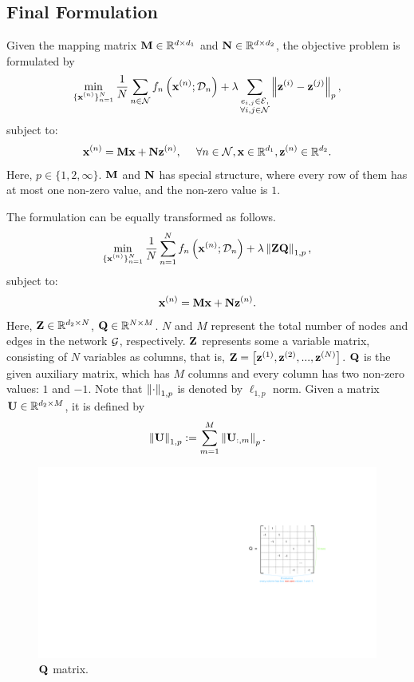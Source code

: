 \documentclass[journal]{IEEEtran}
\begin{document}
\subsection{Final Formulation}
Given the mapping matrix ${\bf M}\in\mathbb{R}^{d\times d_1}$ and ${\bf N}\in\mathbb{R}^{d\times d_2}$, the objective problem is formulated by
\begin{align}
\nonumber
\min_{\substack{\{{\bf x}^{(n)}\}_{n=1}^N}} \frac{1}{N}\sum_{n\in{\mathcal{N}}} f_n\left( {\bf x}^{(n)}; \mathcal{D}_n \right) + \lambda \sum_{\substack{e_{i,j} \in {\mathcal{E}},\\ \forall i,j\in{\mathcal{N}}}} \left\lVert{\bf z}^{(i)} - {\bf z}^{(j)}\right\rVert_p,
\end{align} subject to:
\begin{align}
\nonumber
{\bf x}^{(n)} = {\bf M}{\bf x} + {\bf N} {\bf z}^{(n)},{~~~~}\forall n\in{\mathcal{N}}, {\bf x}\in\mathbb{R}^{d_1}, {\bf z}^{(n)}\in\mathbb{R}^{d_2}.
\end{align} Here, $p\in\{1,2,\infty\}$. ${\bf M}$ and ${\bf N}$ has special structure, where every row of them has at most one non-zero value, and the non-zero value is $1$.  

The formulation can be equally transformed as follows.
\begin{align}
\min_{\substack{\{{\bf x}^{(n)}\}_{n=1}^N}} \frac{1}{N}\sum_{n=1}^N f_n\left( {\bf x}^{(n)}; \mathcal{D}_n \right) + \lambda \left\lVert{\bf Z}{\bf Q}\right\rVert_{1,p},
\end{align} subject to:
\begin{align}
{\bf x}^{(n)} = {\bf M}{\bf x} + {\bf N} {\bf z}^{(n)}.
\end{align} Here, ${\bf Z}\in\mathbb{R}^{d_2 \times N}$, ${\bf Q}\in\mathbb{R}^{N\times M}$. $N$ and $M$ represent the total number of nodes and edges in the network ${\mathcal{G}}$, respectively. 
${\bf Z}$ represents some a variable matrix, consisting of $N$ variables as columns, that is, ${\bf Z} = \left [{\bf z}^{(1)}, {\bf z}^{(2)}, ..., {\bf z}^{(N)} \right ]$. ${\bf Q}$ is the given auxiliary matrix, which has $M$ columns and every column has two non-zero values: $1$ and $-1$. Note that $\left\lVert\cdot\right\rVert_{1,p}$ is denoted by $\ell_{1,p}$ norm. Given a matrix ${\bf U}\in\mathbb{R}^{d_2 \times M}$, it is defined by 
\begin{align}
\nonumber
\left\lVert{\bf U}\right\rVert_{1,p} := \sum_{m=1}^M \left\lVert{\bf U}_{:, m}\right\rVert_p.
\end{align}

\begin{figure}[!t]
\setlength{\abovecaptionskip}{0pt}
\setlength{\belowcaptionskip}{0pt}
\centering 
\includegraphics[width=0.97\columnwidth]{figs/figs_Q_matrix}
\caption{${\bf Q}$ matrix.}
\label{figure_xxx}
\end{figure}
\end{document}
